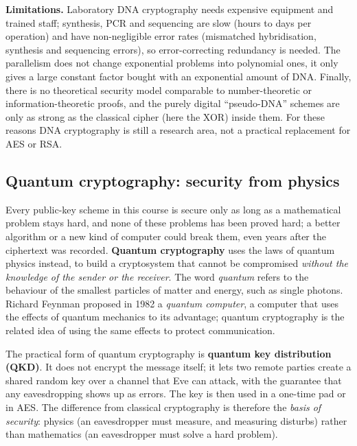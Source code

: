 \textbf{Limitations.} Laboratory DNA cryptography needs expensive equipment and trained staff; synthesis, PCR and sequencing are slow (hours to days per operation) and have non-negligible error rates (mismatched hybridisation, synthesis and sequencing errors), so error-correcting redundancy is needed. The parallelism does not change exponential problems into polynomial ones, it only gives a large constant factor bought with an exponential amount of DNA. Finally, there is no theoretical security model comparable to number-theoretic or information-theoretic proofs, and the purely digital ``pseudo-DNA'' schemes are only as strong as the classical cipher (here the XOR) inside them. For these reasons DNA cryptography is still a research area, not a practical replacement for AES or RSA.

\subsection{Quantum cryptography: security from physics \new}

Every public-key scheme in this course is secure only as long as a mathematical problem stays hard, and none of these problems has been proved hard; a better algorithm or a new kind of computer could break them, even years after the ciphertext was recorded. \textbf{Quantum cryptography} uses the laws of quantum physics instead, to build a cryptosystem that cannot be compromised \emph{without the knowledge of the sender or the receiver}. The word \emph{quantum} refers to the behaviour of the smallest particles of matter and energy, such as single photons. Richard Feynman proposed in 1982 a \emph{quantum computer}, a computer that uses the effects of quantum mechanics to its advantage; quantum cryptography is the related idea of using the same effects to protect communication.

The practical form of quantum cryptography is \textbf{quantum key distribution (QKD)}. It does not encrypt the message itself; it lets two remote parties create a shared random key over a channel that Eve can attack, with the guarantee that any eavesdropping shows up as errors. The key is then used in a one-time pad or in AES. The difference from classical cryptography is therefore the \emph{basis of security}: physics (an eavesdropper must measure, and measuring disturbs) rather than mathematics (an eavesdropper must solve a hard problem).

